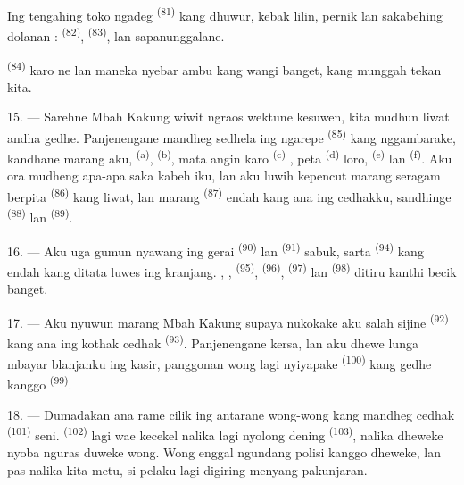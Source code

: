 Ing tengahing toko ngadeg  \textsuperscript{(81)} kang
dhuwur, kebak lilin, pernik lan sakabehing dolanan :  \textsuperscript{(82)},  \textsuperscript{(83)}, lan
sapanunggalane.

 \textsuperscript{(84)} karo ne lan maneka  nyebar ambu kang
wangi banget, kang munggah tekan kita.

\VUsaut{3.4mm}
\VUsaut{2.8mm}

15. --- Sarehne Mbah Kakung wiwit ngraos wektune kesuwen, kita mudhun
liwat andha gedhe. Panjenengane mandheg sedhela ing ngarepe
 \textsuperscript{(85)} kang nggambarake, kandhane
marang aku,  \textsuperscript{(a)},  \textsuperscript{(b)}, mata angin karo  \textsuperscript{(c)} , peta  \textsuperscript{(d)} loro,
 \textsuperscript{(e)} lan 
\textsuperscript{(f)}. Aku ora mudheng apa-apa saka kabeh iku, lan aku
luwih kepencut marang seragam berpita 
\textsuperscript{(86)} kang liwat, lan marang 
\textsuperscript{(87)} endah kang ana ing cedhakku, sandhinge
 \textsuperscript{(88)} lan 
\textsuperscript{(89)}.

16. --- Aku uga gumun nyawang ing gerai 
\textsuperscript{(90)} lan  \textsuperscript{(91)} sabuk,
sarta  \textsuperscript{(94)} kang endah kang
ditata luwes ing kranjang. , ,  \textsuperscript{(95)},  \textsuperscript{(96)}, 
\textsuperscript{(97)} lan 
\textsuperscript{(98)} ditiru kanthi becik banget.

\VUsaut{4.4mm}
\VUsaut{2.8mm}

17. --- Aku nyuwun marang Mbah Kakung supaya nukokake aku salah sijine
 \textsuperscript{(92)} kang ana ing kothak cedhak
 \textsuperscript{(93)}. Panjenengane kersa, lan aku
dhewe lunga mbayar blanjanku ing kasir, panggonan wong lagi nyiyapake
 \textsuperscript{(100)} kang gedhe kanggo
 \textsuperscript{(99)}.

18. --- Dumadakan ana rame cilik ing antarane wong-wong kang mandheg
cedhak  \textsuperscript{(101)} seni.
 \textsuperscript{(102)} lagi wae kecekel nalika lagi
nyolong dening  \textsuperscript{(103)}, nalika dheweke
nyoba nguras duweke wong. Wong enggal ngundang polisi kanggo
 dheweke, lan pas nalika kita metu, si pelaku lagi
digiring menyang pakunjaran.

\VUsaut{6.0mm}
\VUfilet{22mm}
